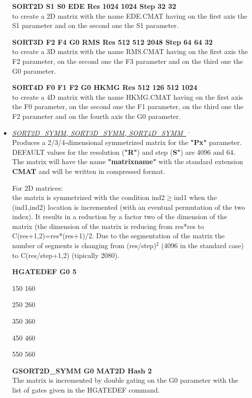 \begin{itemize}
	\hskip1cm{\bf SORT2D  S1 S0 EDE Res 1024 1024 Step 32 32}\\
	to create a 2D matrix with the name EDE.CMAT having on the
	first axis the S1 parameter and on the second one the S1 
	parameter.

	\hskip1cm{\bf SORT3D  F2 F4 G0 RMS Res 512 512 2048 Step 64 64 32}\\
	to create a 3D matrix with the name RMS.CMAT having on the
	first axis the F2 parameter, on the second one the F3 parameter and on
	the third one the G0 parameter.

	\hskip1cm{\bf SORT4D  F0 F1 F2 G0 HKMG Res 512 126 512 1024}\\
	to create a 4D matrix with the name HKMG.CMAT having on the
	first axis the F0 parameter, on the second one the F1 parameter, on
	the third one the F2 parameter and on the fourth axis the G0 parameter.

 \item	{\it\underline{SORT2D\_SYMM, SORT3D\_SYMM, SORT4D\_SYMM~}}
	\footnotemark[4]$^,$\footnotemark[5] \\

	Produces a 2/3/4-dimensional symmetrized matrix for the {\bf "Px"} 
	parameter.
	DEFAULT values for the resolution ({\bf "R"}) and step ({\bf S"}) are 
	4096 and 64.
	The matrix will have the name {\bf "matrixname"} with the standard
	extension {\bf CMAT} and will be written in compressed format.	

	For 2D matrices:\\
	the matrix is symmetrized with the condition ind2$\geq$ind1 when
	the (ind1,ind2) location is incremented (with an eventual 
	permutation of the two index).
	It results in a  reduction by a factor two of the dimension of
	the matrix (the dimension of the matrix is reducing from
	res*res to C(res+1,2)=res*(res+1)/2. Due to the segmentation of 
	the matrix the number of segments is changing from (res/step)$^2$ 
	(4096 in the standard case) to C(res/step+1,2) (tipically 2080).
		    
	\hskip1cm{\bf HGATEDEF G0 5 

	\hskip1.5cm 150 160

	\hskip1.5cm 250 260

	\hskip1.5cm 350 360

	\hskip1.5cm 450 460

	\hskip1.5cm 550 560}

	\hskip1cm{\bf GSORT2D\_SYMM G0 MAT2D Hash 2}\\
	The matrix is incremented by double gating on the G0 parameter with the
	list of gates given in the HGATEDEF command.\\


\end{itemize}
